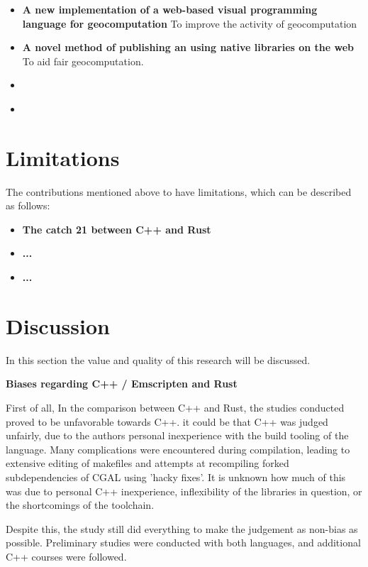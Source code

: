 \begin{itemize}[-]
  \item \textbf{A new implementation of a web-based visual programming language for geocomputation}
    To improve the activity of geocomputation
  \item \textbf{A novel method of publishing an using native libraries on the web}
    To aid fair geocomputation.
  \item \textbf{}

  \item \textbf{}
\end{itemize}


\section{Limitations}
\label{sec:limitations}

The contributions mentioned above to have limitations, which can be described as follows:

\begin{itemize}[-]
  \item \textbf{The catch 21 between C++ and Rust}
  \item \textbf{...}
  \item \textbf{...}
\end{itemize}

\section{Discussion}
\label{sec:discussion}
In this section the value and quality of this research will be discussed. 

\textbf{Biases regarding C++ / Emscripten and Rust}

First of all, In the comparison between C++ and Rust, the studies conducted proved to be unfavorable towards C++. 
it could be that C++ was judged unfairly, due to the authors personal inexperience with the build tooling of the language. 
Many complications were encountered during compilation, leading to extensive editing of makefiles and attempts at recompiling forked subdependencies of CGAL using 'hacky fixes'.  
It is unknown how much of this was due to personal C++ inexperience, inflexibility of the libraries in question, or the shortcomings of the toolchain. 

Despite this, the study still did everything to make the judgement as non-bias as possible.
Preliminary studies were conducted with both languages, and additional C++ courses were followed. 

